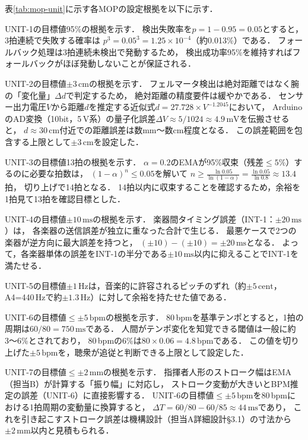 表\ref{tab:mop-unit}に示す各MOPの設定根拠を以下に示す．

UNIT-1の目標値95\%の根拠を示す．
検出失敗率を$p = 1 - 0.95 = 0.05$とすると，3拍連続で失敗する確率は
$p^3 = 0.05^3 = 1.25 \times 10^{-4}$（約0.013\%）である．
フォールバック処理は3拍連続未検出で発動するため，
検出成功率95\%を維持すればフォールバックがほぼ発動しないことが保証される．

UNIT-2の目標値$\pm 3\,\mathrm{cm}$の根拠を示す．
フェルマータ検出は絶対距離ではなく腕の「変化量」$\Delta d$で判定するため，
絶対距離の精度要件は緩やかである．
センサー出力電圧$V$から距離$d$を推定する近似式$d = 27.728 \times V^{-1.2045}$において，
ArduinoのAD変換（10bit，5\,V系）の量子化誤差$\Delta V \approx 5/1024 \approx 4.9\,\mathrm{mV}$を伝搬させると，
$d \approx 30\,\mathrm{cm}$付近での距離誤差は数mm〜数cm程度となる．
この誤差範囲を包含する上限として$\pm 3\,\mathrm{cm}$を設定した．

UNIT-3の目標値13拍の根拠を示す．
$\alpha=0.2$のEMAが95\%収束（残差$\leq 5\%$）するのに必要な拍数は，
$(1-\alpha)^n \leq 0.05$を解いて
$n \geq \frac{\ln 0.05}{\ln(1-\alpha)} = \frac{\ln 0.05}{\ln 0.8} \approx 13.4$拍，
切り上げで14拍となる．
14拍以内に収束することを確認するため，余裕を1拍見て13拍を確認目標とした．

UNIT-4の目標値$\pm 10\,\mathrm{ms}$の根拠を示す．
楽器間タイミング誤差（INT-1：$\pm 20\,\mathrm{ms}$）は，
各楽器の送信誤差が独立に重なった合計で生じる．
最悪ケースで2つの楽器が逆方向に最大誤差を持つと，
$(\pm 10) - (\pm 10) = \pm 20\,\mathrm{ms}$となる．
よって，各楽器単体の誤差をINT-1の半分である$\pm 10\,\mathrm{ms}$以内に抑えることでINT-1を満たせる．

UNIT-5の目標値$\pm 1\,\mathrm{Hz}$は，音楽的に許容されるピッチのずれ（約$\pm 5\,\mathrm{cent}$，
A4=440\,Hzで約$\pm 1.3\,\mathrm{Hz}$\cite{jnd1974}）に対して余裕を持たせた値である．

UNIT-6の目標値$\leq \pm 5\,\mathrm{bpm}$の根拠を示す．
80\,bpmを基準テンポとすると，1拍の周期は$60/80 = 750\,\mathrm{ms}$である．
人間がテンポ変化を知覚できる閾値は一般に約3〜6\%とされており，
80\,bpmの6\%は$80 \times 0.06 = 4.8\,\mathrm{bpm}$である．
この値を切り上げた$\pm 5\,\mathrm{bpm}$を，聴衆が追従と判断できる上限として設定した．

UNIT-7の目標値$\leq \pm 2\,\mathrm{mm}$の根拠を示す．
指揮者人形のストローク幅はEMA（担当B）が計算する「振り幅」に対応し，
ストローク変動が大きいとBPM推定の誤差（UNIT-6）に直接影響する．
UNIT-6の目標値$\leq \pm 5\,\mathrm{bpm}$を80\,bpmにおける1拍周期の変動量に換算すると，
$\Delta T = 60/80 - 60/85 \approx 44\,\mathrm{ms}$であり，
これを引き起こすストローク誤差は機構設計（担当A詳細設計§3.1）の寸法から$\pm 2\,\mathrm{mm}$以内と見積もられる．

